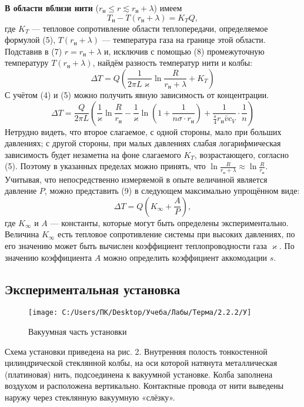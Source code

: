 \documentclass[12pt,a4paper]{article}
\begin{document}
	\textbf{В области вблизи нити} ($r_\text{н} \leqslant r \lesssim r_\text{н} + \lambda$) имеем
	\begin{equation}
	T_\text{н} - T(r_\text{н} + \lambda) = K_T Q,
	\end{equation}
	где $K_T$ — тепловое сопротивление области теплопередачи, определяемое формулой (5), $T(r_\text{н} + \lambda)$ — температура газа на границе этой области. Подставив в (7) $r = r_\text{н} + \lambda$ и, исключив с помощью (8) промежуточную температуру $T(r_\text{н} + \lambda)$, найдём разность температур нити и колбы:
	\begin{equation}
	\Delta T=Q\left(\frac{1}{2 \pi L \varkappa} \ln \frac{R}{r_{\text{н}}+\lambda}+K_{T}\right)
	\end{equation}
	С учётом (4) и (5) можно получить явную зависимость от концентрации.
	\begin{equation}
	\Delta T = 
	\frac{Q}{2 \pi L} \left( 
	\frac{1}{\varkappa}\ln \frac{R}{r_{\text{н}}} - 
	\frac{1}{\varkappa}\ln \left(1 + \frac{1}{n\sigma\cdot r_\text{н}}\right) + 
	\frac{1}{\frac{s}{4} r_{\text{н}} \bar{v} c_{V}} \cdot \frac{1}{n} \right)
	\end{equation}
	Нетрудно видеть, что второе слагаемое, с одной стороны, мало при больших давлениях; с другой стороны, при малых давлениях слабая логарифмическая зависимость будет незаметна на фоне слагаемого $K_T$, возрастающего, согласно (5). Поэтому в указанных пределах можно принять, что $\ln \frac{R}{r_{\text{н}}+\lambda} \approx \ln \frac{R}{r_{\text{н}}}$. Учитывая, что непосредственно измеряемой в опыте величиной является давление $P$, можно представить (9) в следующем максимально упрощённом виде:
	\begin{equation}
	\Delta T = Q\left(K_\infty + \frac{A}{P}\right),
	\end{equation}
	где $K_\infty$ и $A$ — константы, которые могут быть определены экспериментально. Величина $K_\infty$ есть тепловое сопротивление системы при высоких давлениях, по его значению может быть вычислен коэффициент теплопроводности газа $\varkappa$. По значению коэффициента $A$ можно определить коэффициент аккомодации $s$.



\subsection*{Экспериментальная установка}
	\begin{figure}
		\centering
		\texttt{[image: C:/Users/ПК/Desktop/Учеба/Лабы/Терма/2.2.2/У]}
		\caption{Вакуумная часть установки}
		\label{fig:}
	\end{figure}
	Схема установки приведена на рис. 2. Внутренняя полость тонкостенной цилиндрической стеклянной колбы, на оси которой натянута металлическая (платиновая) нить, подсоединена к вакуумной установке. Колба заполнена воздухом и расположена вертикально. Контактные провода от нити выведены наружу через стеклянную вакуумную «слёзку».
	
\end{document}
